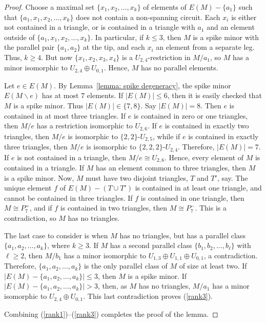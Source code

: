\documentclass[11pt]{amsart}
\numberwithin{equation}{section} %
\begin{document}
\begin{proof}
Choose a maximal set $\{x_1,x_2,\ldots,x_k\}$ of elements of $E(M) - \{a_1\}$ such that $\{a_1,x_1,x_2,\ldots,x_k\}$ does not contain a non-spanning circuit. Each $x_i$ is either not contained in a triangle, or is contained in a triangle with $a_1$ and an element outside of $\{a_1,x_1,x_2,\ldots,x_k\}$. In particular, if $k \leq 3$, then $M$ is a spike minor with the parallel pair $\{a_1,a_2\}$ at the tip, and each $x_i$ an element from a separate leg. Thus, $k \geq 4$. But now $\{x_1,x_2,x_3,x_4\}$ is a $U_{2,4}$-restriction in $M / a_1$, so $M$ has a minor isomorphic to $U_{2,4} \oplus U_{0,1}$. Hence, $M$ has no parallel elements.

Let $e\in E(M)$. By Lemma~\ref{lemma: spike degeneracy}, the spike minor $E(M \backslash e)$ has at most $7$ elements. If $|E(M)|\le 6$, then it is easily checked that $M$ is a spike minor. Thus $|E(M)|\in \{7, 8\}$. Say $|E(M)| = 8$. Then $e$ is contained in at most three triangles. If $e$ is contained in zero or one triangles, then $M/e$ has a restriction isomorphic to $U_{2, 6}$. If $e$ is contained in exactly two triangles, then $M/e$ is isomorphic to $\{2, 2\}$-$U_{2, 5}$, while if $e$ is contained in exactly three triangles, then $M/e$ is isomorphic to $\{2,2,2\}$-$U_{2, 4}$. Therefore, $|E(M)| = 7$. If $e$ is not contained in a triangle, then $M/e\cong U_{2, 6}$. Hence, every element of $M$ is contained in a triangle. If $M$ has an element common to three triangles, then $M$ is a spike minor. Now, $M$ must have two disjoint triangles, $T$ and $T'$, say. The unique element $f$ of $E(M) - (T \cup T')$ is contained in at least one triangle, and cannot be contained in three triangles. If $f$ is contained in one triangle, then $M \cong P_7^=$, and if $f$ is contained in two triangles, then $M \cong P_7^-$. This is a contradiction, so $M$ has no triangles.

The last case to consider is when $M$ has no triangles, but has a parallel class $\{a_1, a_2, \ldots, a_k\}$, where $k\ge 3$. If $M$ has a second parallel class $\{b_1,b_2,\ldots,b_\ell\}$ with $\ell \geq 2$, then $M / b_1$ has a minor isomorphic to $U_{1, 3}\oplus U_{1, 1}\oplus U_{0, 1}$, a contradiction. Therefore, $\{a_1, a_2, \ldots, a_k\}$ is the only parallel class of $M$ of size at least two. If $|E(M) - \{a_1, a_2, \ldots, a_k\}|\leq 3$, then $M$ is a spike minor. If $|E(M) - \{a_1, a_2, \ldots, a_k\}| > 3$, then, as $M$ has no triangles, $M/a_1$ has a minor isomorphic to $U_{2, 4}\oplus U_{0, 1}$. This last contradiction proves (\ref{rank3}).

Combining (\ref{rank1})--(\ref{rank3}) completes the proof of the lemma.
\end{proof}
\end{document}
